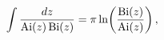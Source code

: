 \[\int\frac{dz}{\mathop{\mathrm{Ai}\/}\nolimits\!\left(z\right)\mathop{\mathrm{%
Bi}\/}\nolimits\!\left(z\right)}=\pi\mathop{\ln\/}\nolimits\!\left(\frac{%
\mathop{\mathrm{Bi}\/}\nolimits\!\left(z\right)}{\mathop{\mathrm{Ai}\/}%
\nolimits\!\left(z\right)}\right),\]